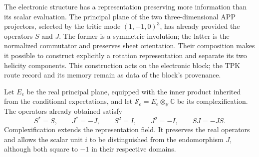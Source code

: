 The electronic structure has a representation preserving more
information than its scalar evaluation. The principal plane of the two
three-dimensional APP projectors, selected by the tritic mode
\((1,-1,0)^3\), has already provided the operators \(S\) and \(J\).
The former is a symmetric involution; the latter is the normalized
commutator and preserves sheet orientation. Their composition makes it possible
to construct explicitly a rotation representation and separate its
two helicity components. This construction acts on the electronic
block; the TPK route record and its memory remain as data
of the block's provenance.

Let \(E_e\) be the real principal plane, equipped with the inner product inherited
from the conditional expectations, and let
\(\mathscr S_e=E_e\otimes_{\mathbb R}\mathbb C\) be its complexification.
The operators already obtained satisfy
\[
 S^*=S,\qquad J^*=-J,\qquad
 S^2=I,\qquad J^2=-I,\qquad SJ=-JS.
\]
Complexification extends the representation field. It preserves the
real operators and allows the scalar unit \(i\) to be distinguished from the
endomorphism \(J\), although both square to \(-1\) in their
respective domains.

